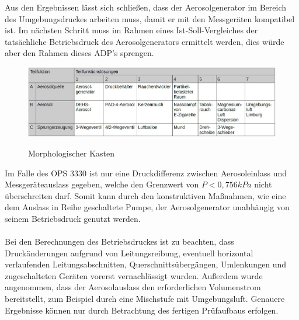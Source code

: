 Aus den Ergebnissen l\"{a}sst sich schlie{\ss}en, dass der Aerosolgenerator im Bereich des Umgebungsdruckes arbeiten muss, damit er mit den Messger\"{a}ten kompatibel ist. Im n\"{a}chsten Schritt muss im Rahmen eines Ist-Soll-Vergleiches der tats\"{a}chliche Betriebsdruck des Aerosolgenerators ermittelt werden, dies w\"{u}rde aber den Rahmen dieses ADP's sprengen.
\begin{figure}[H]
        \myfloatalign
        {\includegraphics[width=.9\linewidth]{gfx/concepts/Morph.jpg}} \quad
        \caption[Morphologischer Kasten]
        {Morphologischer Kasten}
        \label{fig:Morph}
\end{figure}
Im Falle des OPS 3330 ist nur eine Druckdifferenz zwischen Aerosoleinlass und Messger\"{a}teauslass gegeben, welche den Grenzwert von \(P < 0,756 kPa\) nicht \"{u}berschreiten darf. Somit kann durch den konstruktiven Ma{\ss}nahmen, wie eine dem Auslass in Reihe geschaltete Pumpe, der Aerosolgenerator unabh\"{a}ngig von seinem Betriebsdruck genutzt werden.
\\\\
Bei den Berechnungen des Betriebsdruckes ist zu beachten, dass Druck\"{a}nderungen aufgrund von Leitungsreibung, eventuell horizontal verlaufenden Leitungsabschnitten, Querschnitts\"{u}berg\"{a}ngen, Umlenkungen und zugeschalteten Ger\"{a}ten vorerst vernachl\"{a}ssigt wurden. Au{\ss}erdem wurde angenommen, dass der Aerosolauslass den erforderlichen Volumenstrom bereitstellt, zum Beispiel durch eine Mischstufe mit Umgebungsluft. Genauere Ergebnisse k\"{o}nnen nur durch Betrachtung des fertigen Pr\"{u}faufbaus erfolgen.
\\\\
